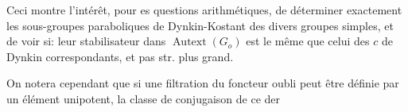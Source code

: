 Ceci montre l'intérêt, pour es questions arithmétiques, de déterminer exactement les sous-groupes parab\handwritten{\unsure{-}}oliques de Dynkin-Kostant des divers groupes simples, et de voir si: leur stabilisateur dans $\operatorname{Autext}(G_o)$ est le même que celui des $c$ de Dynkin correspondants, et pas str. plus grand.

On notera cependant que si une filtration du foncteur  oubli peut être définie par un élément unipotent, la classe de conjugaison de ce der%
